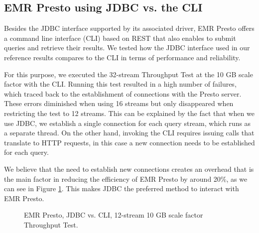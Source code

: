 \subsection{EMR Presto using JDBC vs. the CLI}\label{prestoJDBvsCLI}

Besides the JDBC interface supported by its associated driver, EMR Presto offers a command line interface (CLI) based on REST that also enables to submit queries and retrieve their results. We tested how the JDBC interface used in our reference results compares to the CLI in terms of performance and reliability.

For this purpose, we executed the 32-stream Throughput Test at the 10 GB scale factor with the CLI. Running this test resulted in a high number of failures, which traced back to the establishment of connections with the Presto server. These errors diminished when using 16 streams but only disappeared when restricting the test to 12 streams. This can be explained by the fact that when we use JDBC, we establish a single connection for each query stream, which runs as a separate thread. On the other hand, invoking the CLI requires issuing calls that translate to HTTP requests, in this case a new connection needs to be established for each query.

We believe that the need to establish new connections creates an overhead that is the main factor in reducing the efficiency of EMR Presto by around 20\%, as we can see in Figure \ref{fig:validationExperimentsPrestoCLITputTest}. This makes JDBC the preferred method to interact with EMR Presto.

\begin{figure}
   \begin{center}
   \end{center}
   \caption{EMR Presto, JDBC vs. CLI, 12-stream 10 GB scale factor Throughput Test.}
   \label{fig:validationExperimentsPrestoCLITputTest}
\end{figure}

